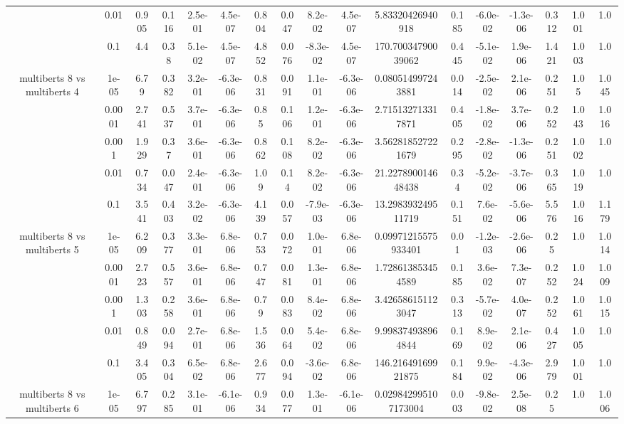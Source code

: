\begin{tabular}{|c|c|c|c|c|c|c|c|c|c|c|c|c|c|c|c|c|}
 & 0.01 & 0.905 & 0.116 & 2.5e-01 & 4.5e-07 & 0.804 & 0.047 & 8.2e-02 & 4.5e-07 & 5.83320426940918 & 0.185 & -6.0e-02 & -1.3e-06 & 0.312 & 1.001 & 1.0 \\
 & 0.1 & 4.4 & 0.38 & 5.1e-02 & 4.5e-07 & 4.852 & 0.076 & -8.3e-02 & 4.5e-07 & 170.70034790039062 & 0.445 & -5.1e-02 & 1.9e-06 & 1.421 & 1.003 & 1.0 \\
\hline
\multirow{5}{*}{multiberts 8 vs multiberts 4} & 1e-05 & 6.79 & 0.382 & 3.2e-01 & -6.3e-06 & 0.831 & 0.091 & 1.1e-01 & -6.3e-06 & 0.080514997243881 & 0.014 & -2.5e-02 & 2.1e-06 & 0.251 & 1.05 & 1.045 \\
 & 0.0001 & 2.741 & 0.537 & 3.7e-01 & -6.3e-06 & 0.85 & 0.106 & 1.2e-01 & -6.3e-06 & 2.715132713317871 & 0.405 & -1.8e-02 & 3.7e-06 & 0.252 & 1.043 & 1.016 \\
 & 0.001 & 1.929 & 0.37 & 3.6e-01 & -6.3e-06 & 0.862 & 0.108 & 8.2e-02 & -6.3e-06 & 3.562818527221679 & 0.295 & -2.8e-02 & -1.3e-06 & 0.251 & 1.002 & 1.0 \\
 & 0.01 & 0.734 & 0.047 & 2.4e-01 & -6.3e-06 & 1.09 & 0.14 & 8.2e-02 & -6.3e-06 & 21.227890014648438 & 0.34 & -5.2e-02 & -3.7e-06 & 0.365 & 1.019 & 1.0 \\
 & 0.1 & 3.541 & 0.403 & 3.2e-02 & -6.3e-06 & 4.139 & 0.057 & -7.9e-03 & -6.3e-06 & 13.298393249511719 & 0.151 & 7.6e-02 & -5.6e-06 & 5.576 & 1.016 & 1.179 \\
\hline
\multirow{5}{*}{multiberts 8 vs multiberts 5} & 1e-05 & 6.209 & 0.377 & 3.3e-01 & 6.8e-06 & 0.753 & 0.072 & 1.0e-01 & 6.8e-06 & 0.09971215575933401 & 0.01 & -1.2e-03 & -2.6e-06 & 0.25 & 1.0 & 1.014 \\
 & 0.0001 & 2.723 & 0.557 & 3.6e-01 & 6.8e-06 & 0.747 & 0.081 & 1.3e-01 & 6.8e-06 & 1.728613853454589 & 0.185 & 3.6e-02 & 7.3e-07 & 0.252 & 1.024 & 1.009 \\
 & 0.001 & 1.303 & 0.258 & 3.6e-01 & 6.8e-06 & 0.79 & 0.083 & 8.4e-02 & 6.8e-06 & 3.426586151123047 & 0.313 & -5.7e-02 & 4.0e-07 & 0.252 & 1.061 & 1.015 \\
 & 0.01 & 0.849 & 0.094 & 2.7e-01 & 6.8e-06 & 1.536 & 0.064 & 5.4e-02 & 6.8e-06 & 9.998374938964844 & 0.169 & 8.9e-02 & 2.1e-06 & 0.427 & 1.005 & 1.0 \\
 & 0.1 & 3.405 & 0.304 & 6.5e-02 & 6.8e-06 & 2.677 & 0.094 & -3.6e-02 & 6.8e-06 & 146.21649169921875 & 0.184 & 9.9e-02 & -4.3e-06 & 2.979 & 1.001 & 1.0 \\
\hline
\multirow{5}{*}{multiberts 8 vs multiberts 6} & 1e-05 & 6.797 & 0.285 & 3.1e-01 & -6.1e-06 & 0.934 & 0.077 & 1.3e-01 & -6.1e-06 & 0.029842995107173004 & 0.003 & -9.8e-02 & 2.5e-08 & 0.25 & 1.0 & 1.006 \\

\end{tabular}
